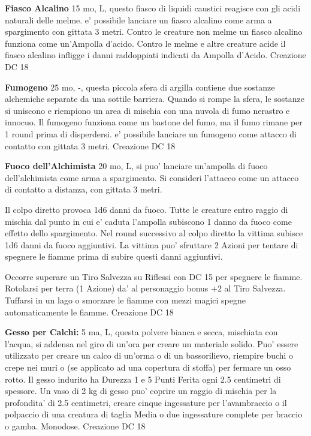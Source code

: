 \documentclass[a4paper,11pt,twoside,openany]{book}
\begin{document}
{\textbf{Fiasco Alcalino} 15 mo, L, questo fiasco di liquidi caustici reagisce con gli acidi naturali delle melme. e' possibile lanciare un fiasco alcalino come arma a spargimento con gittata 3 metri. Contro le creature non melme un fiasco alcalino funziona come un'Ampolla d'acido. Contro le melme e altre creature acide il fiasco alcalino infligge i danni raddoppiati indicati da Ampolla d'Acido. Creazione DC 18

\textbf{Fumogeno} 25 mo, -, questa piccola sfera di argilla contiene due sostanze alchemiche separate da una sottile barriera. Quando si rompe la sfera, le sostanze si uniscono e riempiono un area di mischia con una nuvola di fumo nerastro e innocuo. Il fumogeno funziona come un bastone del fumo, ma il fumo rimane per 1 round prima di disperdersi. e' possibile lanciare un fumogeno come attacco di contatto con gittata 3 metri. Creazione DC 18

\textbf{Fuoco dell'Alchimista} 20 mo, L, si puo' lanciare un'ampolla di fuoco dell'alchimista come arma a spargimento. Si consideri l'attacco come un attacco di contatto a distanza, con gittata 3 metri.

Il colpo diretto provoca 1d6 danni da fuoco. Tutte le creature entro raggio di mischia dal punto in cui e' caduta l'ampolla subiscono 1 danno da fuoco come effetto dello spargimento. Nel round successivo al colpo diretto la vittima subisce 1d6 danni da fuoco aggiuntivi. La vittima puo' sfruttare 2 Azioni per tentare di spegnere le fiamme prima di subire questi danni aggiuntivi. 

Occorre superare un Tiro Salvezza su Riflessi con DC 15 per spegnere le fiamme. Rotolarsi per terra (1 Azione) da' al personaggio bonus +2 al Tiro Salvezza. Tuffarsi in un lago o smorzare le fiamme con mezzi magici spegne automaticamente le fiamme. Creazione DC 18

\textbf{Gesso per Calchi:} 5 ma, L, questa polvere bianca e secca, mischiata con l’acqua, si addensa nel giro di un’ora per creare un materiale solido. Puo' essere utilizzato per creare un calco di un’orma o di un bassorilievo, riempire buchi o crepe nei muri o (se applicato ad una copertura di stoffa) per fermare un osso rotto. Il gesso indurito ha Durezza 1 e 5 Punti Ferita ogni 2.5 centimetri di spessore. Un vaso di 2 kg di gesso puo' coprire un raggio di mischia per la profondita' di 2.5 centimetri, creare cinque ingessature per l’avambraccio o il polpaccio di una creatura di taglia Media o due ingessature complete per braccio o gamba. Monodose. Creazione DC 18

}
\end{document}

